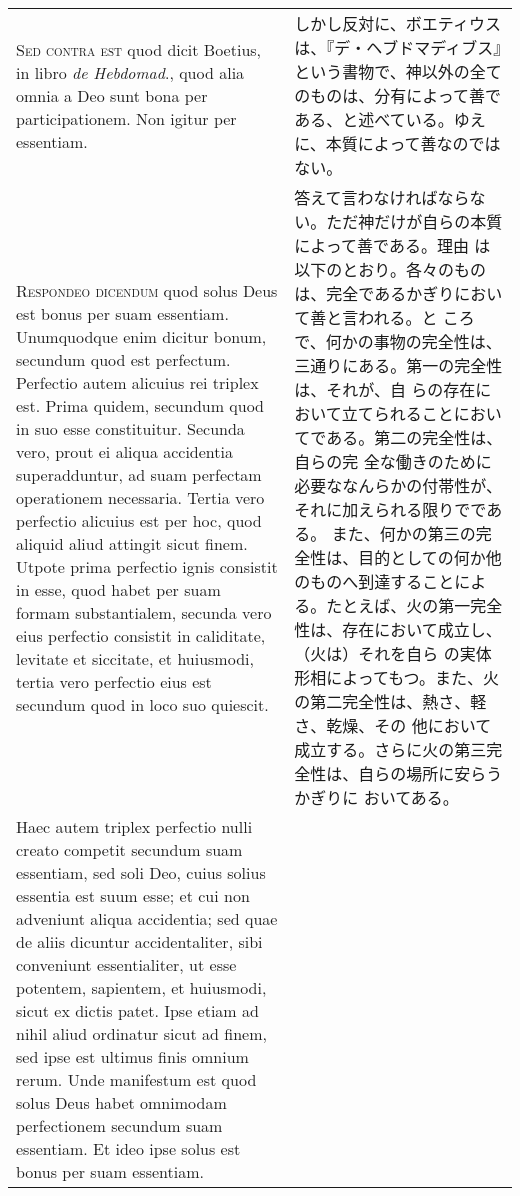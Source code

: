 \documentclass[10pt]{jsarticle} %
\begin{document}
\begin{longtable}{p{21em}p{21em}}
\\

{\scshape Sed contra est} quod dicit Boetius, in libro {\itshape de
Hebdomad}., quod alia omnia a Deo sunt bona per participationem. Non
igitur per essentiam.

&

しかし反対に、ボエティウスは、『デ・ヘブドマディブス』という書物で、神以外の全てのものは、分有によって善である、と述べている。ゆえに、本質によって善なのではない。
\\

{\scshape Respondeo dicendum} quod solus Deus est bonus per suam
essentiam. Unumquodque enim dicitur bonum, secundum quod est
perfectum. Perfectio autem alicuius rei triplex est. Prima quidem,
secundum quod in suo esse constituitur. Secunda vero, prout ei aliqua
accidentia superadduntur, ad suam perfectam operationem
necessaria. Tertia vero perfectio alicuius est per hoc, quod aliquid
aliud attingit sicut finem. Utpote prima perfectio ignis consistit in
esse, quod habet per suam formam substantialem, secunda vero eius
perfectio consistit in caliditate, levitate et siccitate, et huiusmodi,
tertia vero perfectio eius est secundum quod in loco suo quiescit. 

&

答えて言わなければならない。ただ神だけが自らの本質によって善である。理由
 は以下のとおり。各々のものは、完全であるかぎりにおいて善と言われる。と
 ころで、何かの事物の完全性は、三通りにある。第一の完全性は、それが、自
 らの存在において立てられることにおいてである。第二の完全性は、自らの完
 全な働きのために必要ななんらかの付帯性が、それに加えられる限りでである。
 また、何かの第三の完全性は、目的としての何か他のものへ到達することによ
 る。たとえば、火の第一完全性は、存在において成立し、（火は）それを自ら
 の実体形相によってもつ。また、火の第二完全性は、熱さ、軽さ、乾燥、その
 他において成立する。さらに火の第三完全性は、自らの場所に安らうかぎりに
 おいてある。


\\

Haec
autem triplex perfectio nulli creato competit secundum suam essentiam,
sed soli Deo, cuius solius essentia est suum esse; et cui non adveniunt
aliqua accidentia; sed quae de aliis dicuntur accidentaliter, sibi
conveniunt essentialiter, ut esse potentem, sapientem, et huiusmodi,
sicut ex dictis patet. Ipse etiam ad nihil aliud ordinatur sicut ad
finem, sed ipse est ultimus finis omnium rerum. Unde manifestum est quod
solus Deus habet omnimodam perfectionem secundum suam essentiam. Et ideo
ipse solus est bonus per suam essentiam.


\end{longtable}
\end{document}
